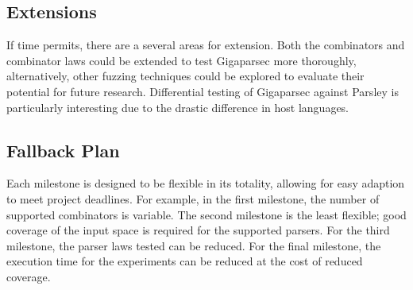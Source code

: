 \documentclass[11pt]{article}
\begin{document}
\subsection{Extensions}

If time permits, there are a several areas for extension. Both the combinators and combinator laws could be extended to test Gigaparsec more thoroughly, alternatively, other fuzzing techniques could be explored to evaluate their potential for future research. Differential testing of Gigaparsec against Parsley is particularly interesting due to the drastic difference in host languages.

\subsection{Fallback Plan}
Each milestone is designed to be flexible in its totality, allowing for easy adaption to meet project deadlines. For example, in the first milestone, the number of supported combinators is variable. The second milestone is the least flexible; good coverage of the input space is required for the supported parsers. For the third milestone, the parser laws tested can be reduced. For the final milestone, the execution time for the experiments can be reduced at the cost of reduced coverage.

\raggedright

\end{document}
